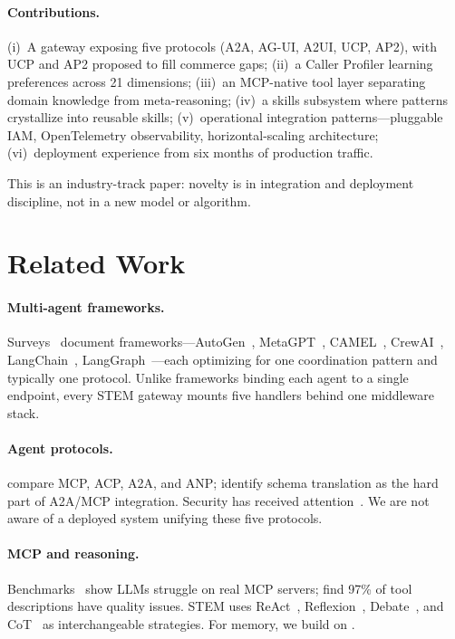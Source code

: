 \documentclass[11pt]{article}
\begin{document}
\paragraph{Contributions.} (i)~A gateway exposing five protocols (A2A, AG-UI, A2UI, UCP, AP2), with UCP and AP2 proposed to fill commerce gaps; (ii)~a Caller Profiler learning preferences across 21 dimensions; (iii)~an MCP-native tool layer separating domain knowledge from meta-reasoning; (iv)~a skills subsystem where patterns crystallize into reusable skills; (v)~operational integration patterns---pluggable IAM, OpenTelemetry observability, horizontal-scaling architecture; (vi)~deployment experience from six months of production traffic.

This is an industry-track paper: novelty is in integration and deployment discipline, not in a new model or algorithm.

\section{Related Work}
\label{sec:related}

\paragraph{Multi-agent frameworks.}
Surveys~\citep{tran2025multiagent, ferrag2025agents} document frameworks---AutoGen~\citep{wu2023autogen}, MetaGPT~\citep{hong2023metagpt}, CAMEL~\citep{li2023camel}, CrewAI~\citep{crewai2023}, LangChain~\citep{chase2022langchain}, LangGraph~\citep{langgraph2024}---each optimizing for one coordination pattern and typically one protocol. Unlike frameworks binding each agent to a single endpoint, every STEM gateway mounts five handlers behind one middleware stack.

\paragraph{Agent protocols.}
\citet{ehtesham2025survey} compare MCP, ACP, A2A, and ANP; \citet{li2025gluetoprotocols} identify schema translation as the hard part of A2A/MCP integration. Security has received attention~\citep{habler2025a2a, anbiaee2026security}. We are not aware of a deployed system unifying these five protocols.

\paragraph{MCP and reasoning.}
Benchmarks~\citep{luo2025mcpuniverse, fan2025mcptoolbench} show LLMs struggle on real MCP servers; \citet{hasan2026mcpsmells} find 97\% of tool descriptions have quality issues. STEM uses ReAct~\citep{yao2023react}, Reflexion~\citep{shinn2023reflexion}, Debate~\citep{du2023debate}, and CoT~\citep{wei2022chain} as interchangeable strategies. For memory, we build on \citet{ai2025memorybench, gallego2026memoryastool, yadav2026synapse}.
\end{document}
